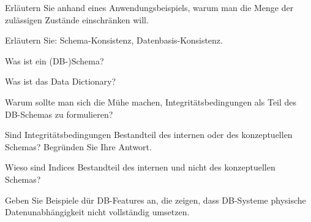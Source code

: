 \begin{fragen}
	\begin{enumeration}
		\item Erläutern Sie anhand eines Anwendungsbeispiels, warum man die Menge der zulässigen Zustände einschränken will.
		\item Erläutern Sie: Schema-Konsistenz, Datenbasis-Konsistenz.
		\item Was ist ein (DB-)Schema?
		\item Was ist das Data Dictionary?
		\item Warum sollte man sich die Mühe machen, Integritätsbedingungen als Teil des DB-Schemas zu formulieren?
		\item Sind Integritätsbedingungen Bestandteil des internen oder des konzeptuellen Schemas? Begründen Sie Ihre Antwort.
		\item Wieso sind Indices Bestandteil des internen und nicht des konzeptuellen Schemas?
		\item Geben Sie Beispiele dür DB-Features an, die zeigen, dass DB-Systeme physische Datenunabhängigkeit nicht vollständig umsetzen.
	\end{enumeration}
\end{fragen}